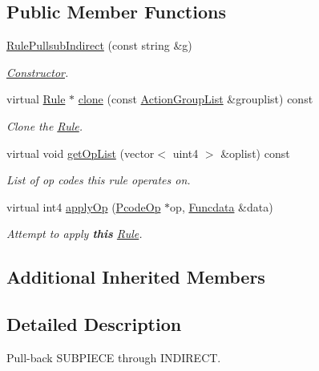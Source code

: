 \subsection*{Public Member Functions}
\begin{DoxyCompactItemize}
\item 
\mbox{\hyperlink{class_rule_pullsub_indirect_a4ea9d02ce15688fa6c78de8602e9da65}{Rule\+Pullsub\+Indirect}} (const string \&g)
\begin{DoxyCompactList}\small\item\em \mbox{\hyperlink{class_constructor}{Constructor}}. \end{DoxyCompactList}\item 
virtual \mbox{\hyperlink{class_rule}{Rule}} $\ast$ \mbox{\hyperlink{class_rule_pullsub_indirect_a6ad44519f0a5f0bd74d31aed1facae02}{clone}} (const \mbox{\hyperlink{class_action_group_list}{Action\+Group\+List}} \&grouplist) const
\begin{DoxyCompactList}\small\item\em Clone the \mbox{\hyperlink{class_rule}{Rule}}. \end{DoxyCompactList}\item 
virtual void \mbox{\hyperlink{class_rule_pullsub_indirect_a08b3e95c2aef200c65231e6d70b3fb4c}{get\+Op\+List}} (vector$<$ uint4 $>$ \&oplist) const
\begin{DoxyCompactList}\small\item\em List of op codes this rule operates on. \end{DoxyCompactList}\item 
virtual int4 \mbox{\hyperlink{class_rule_pullsub_indirect_ae8c0c6b22bd0890c5b9ef806ceb91e58}{apply\+Op}} (\mbox{\hyperlink{class_pcode_op}{Pcode\+Op}} $\ast$op, \mbox{\hyperlink{class_funcdata}{Funcdata}} \&data)
\begin{DoxyCompactList}\small\item\em Attempt to apply {\bfseries{this}} \mbox{\hyperlink{class_rule}{Rule}}. \end{DoxyCompactList}\end{DoxyCompactItemize}
\subsection*{Additional Inherited Members}


\subsection{Detailed Description}
Pull-\/back S\+U\+B\+P\+I\+E\+CE through I\+N\+D\+I\+R\+E\+CT. 

